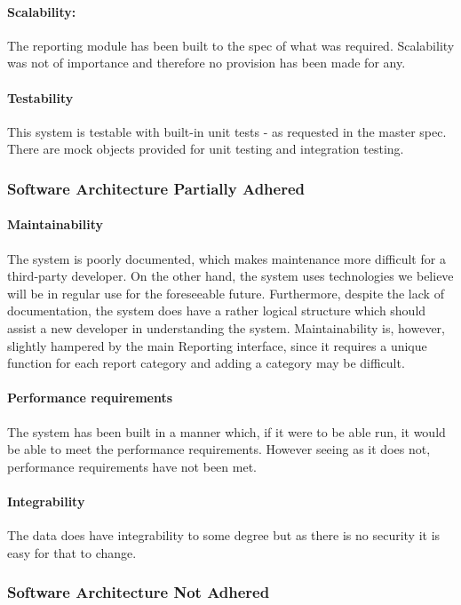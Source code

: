 \documentclass{article}
\begin{document}
            \paragraph{Scalability:}
            The reporting module has been built to the spec of what was required. Scalability was not of importance and therefore no provision has been made for any.
            \paragraph{Testability}
            This system is testable with built-in unit tests - as requested in the master spec. There are mock objects provided for unit testing and integration testing.
        \subsubsection{Software Architecture Partially Adhered}
        	\paragraph{Maintainability}
            The system is poorly documented, which makes maintenance more difficult for a third-party developer. On the other hand, the system uses technologies we believe will be in regular use for the foreseeable future. Furthermore, despite the lack of documentation, the system does have a rather logical structure which should assist a new developer in understanding the system. Maintainability is, however, slightly hampered by the main Reporting interface, since it requires a unique function for each report category and adding a category may be difficult.
			\paragraph{Performance requirements}
            The system has been built in a manner which, if it were to be able run, it would be able to meet the performance requirements. However seeing as it does not, performance requirements have not been met.
            \paragraph{Integrability}
            The data does have integrability to some degree but as there is no security it is easy for that to change.
        \subsubsection{Software Architecture Not Adhered}
\end{document}
